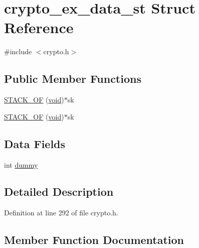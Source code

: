 \hypertarget{structcrypto__ex__data__st}{}\section{crypto\+\_\+ex\+\_\+data\+\_\+st Struct Reference}
\label{structcrypto__ex__data__st}


{\ttfamily \#include $<$crypto.\+h$>$}

\subsection*{Public Member Functions}
\begin{DoxyCompactItemize}
\item 
\hyperlink{structcrypto__ex__data__st_a945280cb8b4803da50a824afa80bd6e5}{S\+T\+A\+C\+K\+\_\+\+OF} (\hyperlink{hw__4758__cca_8h_afad4d591c7931ff6dc5bf69c76c96aa0}{void})$\ast$sk
\item 
\hyperlink{structcrypto__ex__data__st_a945280cb8b4803da50a824afa80bd6e5}{S\+T\+A\+C\+K\+\_\+\+OF} (\hyperlink{hw__4758__cca_8h_afad4d591c7931ff6dc5bf69c76c96aa0}{void})$\ast$sk
\end{DoxyCompactItemize}
\subsection*{Data Fields}
\begin{DoxyCompactItemize}
\item 
int \hyperlink{structcrypto__ex__data__st_a7c1d654b7b6114d7a0abc8d351dd1bcd}{dummy}
\end{DoxyCompactItemize}


\subsection{Detailed Description}


Definition at line 292 of file crypto.\+h.



\subsection{Member Function Documentation}
